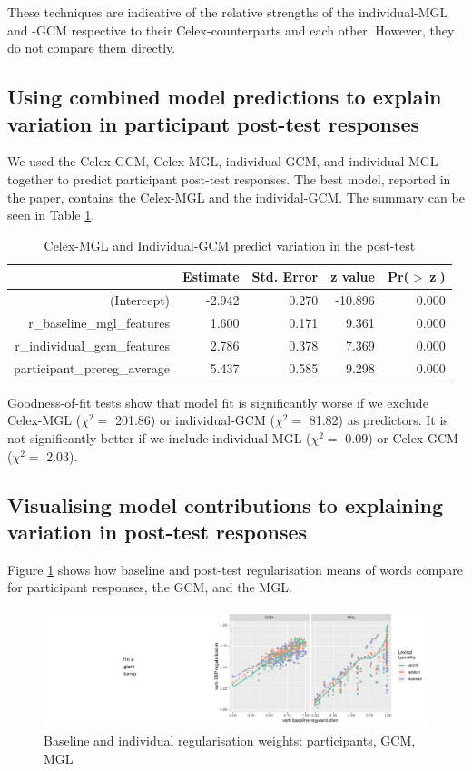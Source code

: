 \documentclass[12pt]{article}
\begin{document}
These techniques are indicative of the relative strengths of the individual-MGL and -GCM respective to their {\sc Celex}-counterparts and each other. However, they do not compare them directly. 

\subsection{Using combined model predictions to explain variation in participant post-test responses}


We used the {\sc Celex}-GCM, {\sc Celex}-MGL, individual-GCM, and individual-MGL together to predict participant post-test responses. The best model, reported in the paper, contains the {\sc Celex}-MGL and the individal-GCM. The summary can be seen in Table \ref{comp3}. 


\begin{table}[ht]
\centering
\begin{tabular}{rrrrr}
  \hline
 & Estimate & Std. Error & z value & Pr($>$$|$z$|$) \\ 
  \hline
(Intercept) & -2.942 & 0.270 & -10.896 & 0.000 \\ 
  r\_baseline\_mgl\_features & 1.600 & 0.171 & 9.361 & 0.000 \\ 
  r\_individual\_gcm\_features & 2.786 & 0.378 & 7.369 & 0.000 \\ 
  participant\_prereg\_average & 5.437 & 0.585 & 9.298 & 0.000 \\ 
   \hline
\end{tabular}
\caption{Celex-MGL and Individual-GCM predict variation in the post-test} 
\label{comp3}
\end{table}
Goodness-of-fit tests show that model fit is significantly worse if we exclude {\sc Celex}-MGL ($\chi^2 = $ 201.86) or individual-GCM ($\chi^2 = $ 81.82) as predictors. It is not significantly better if we include individual-MGL ($\chi^2 = $ 0.09) or {\sc Celex}-GCM ($\chi^2 = $ 2.03).

\subsection{Visualising model contributions to explaining variation in post-test responses}

Figure \ref{bigfigure} shows how baseline and post-test regularisation means of words compare for participant responses, the GCM, and the MGL.


\begin{figure}
\includegraphics{si-model_figure2}
\caption{Baseline and individual regularisation weights: participants, GCM, MGL}
\label{bigfigure}
\end{figure}

\newpage



\end{document}
